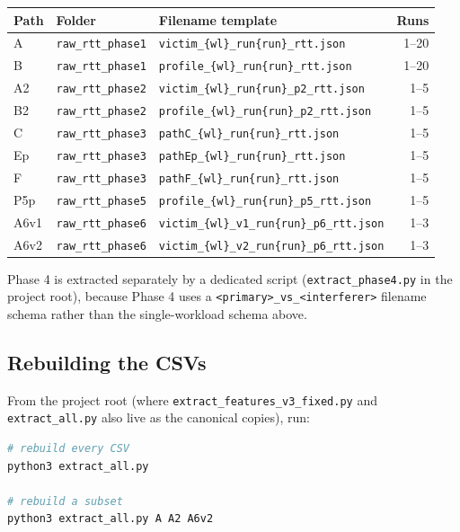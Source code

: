 \documentclass[11pt,a4paper]{article}
\begin{document}
\begin{longtable}{@{}lllr@{}}
\toprule
\textbf{Path} & \textbf{Folder} & \textbf{Filename template} & \textbf{Runs} \\
\midrule
\endhead
A    & \texttt{raw\_rtt\_phase1} & \texttt{victim\_\{wl\}\_run\{run\}\_rtt.json}       & 1--20 \\
B    & \texttt{raw\_rtt\_phase1} & \texttt{profile\_\{wl\}\_run\{run\}\_rtt.json}      & 1--20 \\
A2   & \texttt{raw\_rtt\_phase2} & \texttt{victim\_\{wl\}\_run\{run\}\_p2\_rtt.json}   & 1--5  \\
B2   & \texttt{raw\_rtt\_phase2} & \texttt{profile\_\{wl\}\_run\{run\}\_p2\_rtt.json}  & 1--5  \\
C    & \texttt{raw\_rtt\_phase3} & \texttt{pathC\_\{wl\}\_run\{run\}\_rtt.json}        & 1--5  \\
Ep   & \texttt{raw\_rtt\_phase3} & \texttt{pathEp\_\{wl\}\_run\{run\}\_rtt.json}       & 1--5  \\
F    & \texttt{raw\_rtt\_phase3} & \texttt{pathF\_\{wl\}\_run\{run\}\_rtt.json}        & 1--5  \\
P5p  & \texttt{raw\_rtt\_phase5} & \texttt{profile\_\{wl\}\_run\{run\}\_p5\_rtt.json}  & 1--5  \\
A6v1 & \texttt{raw\_rtt\_phase6} & \texttt{victim\_\{wl\}\_v1\_run\{run\}\_p6\_rtt.json} & 1--3  \\
A6v2 & \texttt{raw\_rtt\_phase6} & \texttt{victim\_\{wl\}\_v2\_run\{run\}\_p6\_rtt.json} & 1--3  \\
\bottomrule
\end{longtable}

Phase 4 is extracted separately by a dedicated script
(\texttt{extract\_phase4.py} in the project root), because Phase 4 uses a
\texttt{<primary>\_vs\_<interferer>} filename schema rather than the
single-workload schema above.

\subsection{Rebuilding the CSVs}

From the project root (where \texttt{extract\_features\_v3\_fixed.py} and
\texttt{extract\_all.py} also live as the canonical copies), run:

\begin{lstlisting}[language=bash]
# rebuild every CSV
python3 extract_all.py

# rebuild a subset
python3 extract_all.py A A2 A6v2
\end{lstlisting}
\end{document}
